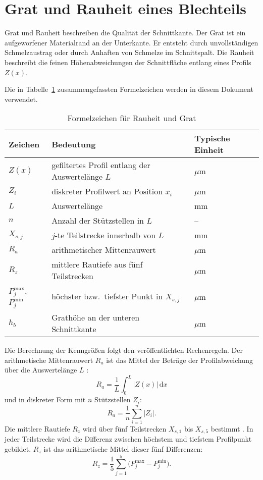 \section{Grat und Rauheit eines Blechteils}
\label{sec:grat-rauheit}

Grat und Rauheit beschreiben die Qualität der Schnittkante. Der Grat ist ein aufgeworfener Materialrand an der Unterkante. Er entsteht durch unvollständigen Schmelzaustrag oder durch Anhaften von Schmelze im Schnittspalt. Die Rauheit beschreibt die feinen Höhenabweichungen der Schnittfläche entlang eines Profils \(Z(x)\).

Die in Tabelle~\ref{tab:symbole-rauheit-grat} zusammengefassten Formelzeichen werden in diesem Dokument verwendet.
\begin{table}[htbp]
  \centering
  \caption{Formelzeichen für Rauheit und Grat}
  \label{tab:symbole-rauheit-grat}
  \begin{tabular}{@{}lll@{}}
    \toprule
    Zeichen & Bedeutung & Typische Einheit \\
    \midrule
    $Z(x)$      & gefiltertes Profil entlang der Auswertelänge $L$ & $\mu$m \\
    $Z_i$       & diskreter Profilwert an Position $x_i$            & $\mu$m \\
    $L$         & Auswertelänge                                      & mm \\
    $n$         & Anzahl der Stützstellen in $L$                     & -- \\
    $X_{s,j}$   & $j$-te Teilstrecke innerhalb von $L$               & mm \\
    $R_a$       & arithmetischer Mittenrauwert                       & $\mu$m \\
    $R_z$       & mittlere Rautiefe aus fünf Teilstrecken            & $\mu$m \\
    $P^{\max}_{j}$, $P^{\min}_{j}$ & höchster bzw.\ tiefster Punkt in $X_{s,j}$ & $\mu$m \\
    $h_b$       & Grathöhe an der unteren Schnittkante               & $\mu$m \\
    \bottomrule
  \end{tabular}
\end{table}

Die Berechnung der Kenngrößen folgt den veröffentlichten Rechenregeln. Der arithmetische Mittenrauwert \(R_a\) ist das Mittel der Beträge der Profilabweichung über die Auswertelänge \(L\) \parencite{MitutoyoQuickGuide}:
\[
R_a=\frac{1}{L}\int_{0}^{L}\lvert Z(x)\rvert\,\mathrm{d}x
\]
und in diskreter Form mit \(n\) Stützstellen \(Z_i\):
\[
R_a=\frac{1}{n}\sum_{i=1}^{n}\lvert Z_i\rvert.
\]
Die mittlere Rautiefe \(R_z\) wird über fünf Teilstrecken \(X_{s,1}\) bis \(X_{s,5}\) bestimmt \parencite{KeyenceISO4287}. In jeder Teilstrecke wird die Differenz zwischen höchstem und tiefstem Profilpunkt gebildet. \(R_z\) ist das arithmetische Mittel dieser fünf Differenzen:
\[
R_z=\frac{1}{5}\sum_{j=1}^{5}\bigl(P^{\max}_{j}-P^{\min}_{j}\bigr).
\]

